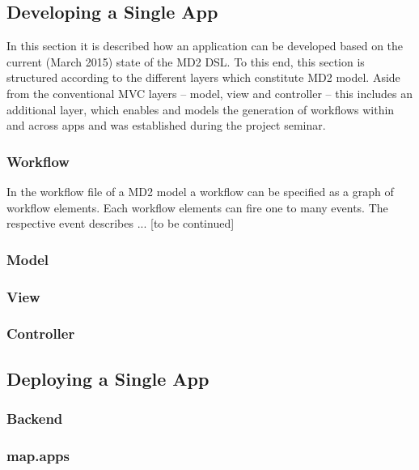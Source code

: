 
\subsection{Developing a Single App} 
\label{subsec:SingleAppDev}
In this section it is described how an application can be developed based on the current (March 2015) state of the MD2 DSL. To this end, this section is structured according to the different layers which constitute MD2 model. Aside from the conventional MVC layers -- model, view and controller -- this includes an additional layer, which enables and models the generation of workflows within and across apps and was established during the project seminar.

\subsubsection{Workflow} 
\label{subsubsec:Workflow}
In the workflow file of a MD2 model a workflow can be specified as a graph of workflow elements. Each workflow elements can fire one to many events. The respective event describes ... [to be continued]


\subsubsection{Model} 
\label{subsubsec:Model}

\subsubsection{View} 
\label{subsubsec:View}

\subsubsection{Controller} 
\label{subsubsec:Controller}


\subsection{Deploying a Single App}
\label{subsec:SingleAppDev}

\subsubsection{Backend} 
\label{subsubsec:Backend}

\subsubsection{map.apps} 
\label{subsubsec:mapapps}
